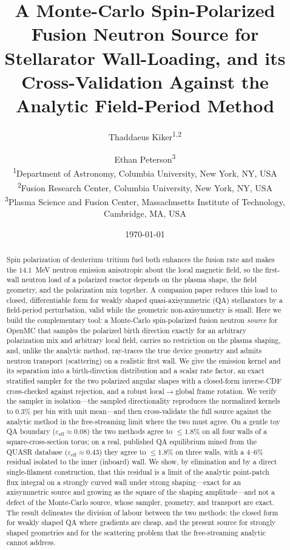 \documentclass[11pt]{article}
\title{\bfseries A Monte-Carlo Spin-Polarized Fusion Neutron Source for Stellarator
Wall-Loading, and its Cross-Validation Against the Analytic Field-Period Method}
\author{
Thaddaeus Kiker\textsuperscript{1,2}
\and
Ethan Peterson\textsuperscript{3}
\\[4pt]
\small \textsuperscript{1}Department of Astronomy, Columbia University, New York, NY, USA\\
\small \textsuperscript{2}Fusion Research Center, Columbia University, New York, NY, USA\\
\small \textsuperscript{3}Plasma Science and Fusion Center, Massachusetts Institute of Technology, Cambridge, MA, USA
}
\date{\today}
\newcommand{\eps}{\varepsilon}
\newcommand{\epseff}{\eps_{\mathrm{eff}}}
\begin{document}
\maketitle

\begin{abstract}
\noindent
Spin polarization of deuterium--tritium fuel both enhances the fusion rate and makes the
$14.1$~MeV neutron emission anisotropic about the local magnetic field, so the first-wall
neutron load of a polarized reactor depends on the plasma shape, the field geometry, and
the polarization mix together. A companion paper reduces this load to closed,
differentiable form for weakly shaped quasi-axisymmetric (QA) stellarators by a
field-period perturbation, valid while the geometric non-axisymmetry is small. Here we
build the complementary tool: a Monte-Carlo spin-polarized fusion neutron \emph{source}
for OpenMC that samples the polarized birth direction exactly for an arbitrary
polarization mix and arbitrary local field, carries no restriction on the plasma shaping,
and, unlike the analytic method, ray-traces the true device geometry and admits neutron
transport (scattering) on a realistic first wall. We give the emission kernel and its
separation into a birth-direction distribution and a scalar rate factor, an exact
stratified sampler for the two polarized angular shapes with a closed-form inverse-CDF
cross-checked against rejection, and a robust local$\to$global frame rotation. We verify
the sampler in isolation---the sampled directionality reproduces the normalized kernels
to $0.3\%$ per bin with unit mean---and then cross-validate the full source against the
analytic method in the free-streaming limit where the two must agree. On a gentle toy QA
boundary ($\epseff\!\approx\!0.08$) the two methods agree to $\le1.8\%$ on all four walls
of a square-cross-section torus; on a real, published QA equilibrium mined from the QUASR
database ($\epseff\!\approx\!0.43$) they agree to $\le1.8\%$ on three walls, with a
$4$--$6\%$ residual isolated to the inner (inboard) wall. We show, by elimination and by
a direct single-filament construction, that this residual is a limit of the analytic
point-patch flux integral on a strongly curved wall under strong shaping---exact for an
axisymmetric source and growing as the square of the shaping amplitude---and not a defect
of the Monte-Carlo source, whose sampler, geometry, and transport are exact. The result
delineates the division of labour between the two methods: the closed form for weakly
shaped QA where gradients are cheap, and the present source for strongly shaped
geometries and for the scattering problem that the free-streaming analytic cannot
address.
\end{abstract}
\end{document}
